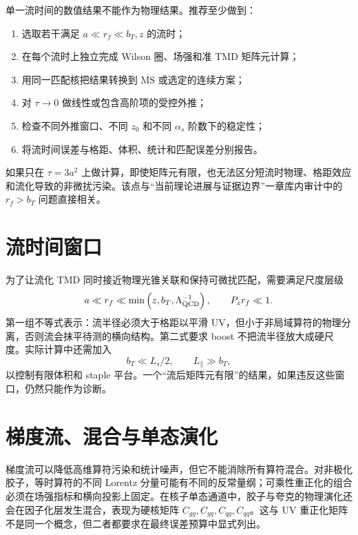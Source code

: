 \documentclass[UTF8,12pt,a4paper,twoside,openany]{ctexbook}
\newcommand{\MSbar}{\overline{\mathrm{MS}}}
\begin{document}
单一流时间的数值结果不能作为物理结果。推荐至少做到：
\begin{enumerate}
  \item 选取若干满足 \(a\ll r_f\ll b_T,z\) 的流时；
  \item 在每个流时上独立完成 Wilson 圈、场强和准 TMD 矩阵元计算；
  \item 用同一匹配核把结果转换到 \(\MSbar\) 或选定的连续方案；
  \item 对 \(\tau\to0\) 做线性或包含高阶项的受控外推；
  \item 检查不同外推窗口、不同 \(z_0\) 和不同 \(\alpha_s\) 阶数下的稳定性；
  \item 将流时间误差与格距、体积、统计和匹配误差分别报告。
  \end{enumerate}
如果只在 \(\tau=3a^2\) 上做计算，即使矩阵元有限，也无法区分短流时物理、格距效应和流化导致的非微扰污染。该点与“当前理论进展与证据边界”一章库内审计中的 \(r_f>b_T\) 问题直接相关。

\section{流时间窗口}

为了让流化 TMD 同时接近物理光锥关联和保持可微扰匹配，需要满足尺度层级
\begin{equation}
  a\ll r_f\ll \min\left(z,b_T,\Lambda_{\rm QCD}^{-1}\right),
  \qquad
  P_zr_f\ll1 .
  \label{eq:flowwindow}
\end{equation}
第一组不等式表示：流半径必须大于格距以平滑 UV，但小于非局域算符的物理分离，否则流会抹平待测的横向结构。第二式要求 boost 不把流半径放大成硬尺度。实际计算中还需加入
\begin{equation}
  b_T\ll L_s/2,
  \qquad
  L_\parallel\gg b_T,
  \label{eq:volumeconditions}
\end{equation}
以控制有限体积和 staple 平台。一个“流后矩阵元有限”的结果，如果违反这些窗口，仍然只能作为诊断。

\section{梯度流、混合与单态演化}

梯度流可以降低高维算符污染和统计噪声，但它不能消除所有算符混合。对非极化胶子，等时算符的不同 Lorentz 分量可能有不同的反常量纲；可乘性重正化的组合必须在场强指标和横向投影上固定\cite{ZhangGluonLaMET2019,LiMaQiu2019}。在核子单态通道中，胶子与夸克的物理演化还会在因子化层发生混合，表现为硬核矩阵 \(C_{gg},C_{gq},C_{qg},C_{qq}\)。这与 UV 重正化矩阵不是同一个概念，但二者都要求在最终误差预算中显式列出。
\end{document}
